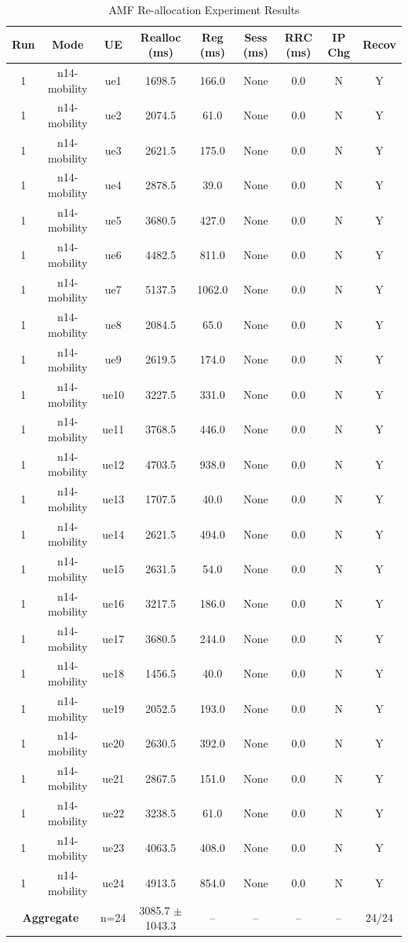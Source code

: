 \begin{table}[ht]
\centering
\begin{tabular}{|c|c|c|c|c|c|c|c|c|}
\hline
Run & Mode & UE & Realloc (ms) & Reg (ms) & Sess (ms) & RRC (ms) & IP Chg & Recov \\
\hline
1 & n14-mobility & ue1 & 1698.5 & 166.0 & None & 0.0 & N & Y \\
1 & n14-mobility & ue2 & 2074.5 & 61.0 & None & 0.0 & N & Y \\
1 & n14-mobility & ue3 & 2621.5 & 175.0 & None & 0.0 & N & Y \\
1 & n14-mobility & ue4 & 2878.5 & 39.0 & None & 0.0 & N & Y \\
1 & n14-mobility & ue5 & 3680.5 & 427.0 & None & 0.0 & N & Y \\
1 & n14-mobility & ue6 & 4482.5 & 811.0 & None & 0.0 & N & Y \\
1 & n14-mobility & ue7 & 5137.5 & 1062.0 & None & 0.0 & N & Y \\
1 & n14-mobility & ue8 & 2084.5 & 65.0 & None & 0.0 & N & Y \\
1 & n14-mobility & ue9 & 2619.5 & 174.0 & None & 0.0 & N & Y \\
1 & n14-mobility & ue10 & 3227.5 & 331.0 & None & 0.0 & N & Y \\
1 & n14-mobility & ue11 & 3768.5 & 446.0 & None & 0.0 & N & Y \\
1 & n14-mobility & ue12 & 4703.5 & 938.0 & None & 0.0 & N & Y \\
1 & n14-mobility & ue13 & 1707.5 & 40.0 & None & 0.0 & N & Y \\
1 & n14-mobility & ue14 & 2621.5 & 494.0 & None & 0.0 & N & Y \\
1 & n14-mobility & ue15 & 2631.5 & 54.0 & None & 0.0 & N & Y \\
1 & n14-mobility & ue16 & 3217.5 & 186.0 & None & 0.0 & N & Y \\
1 & n14-mobility & ue17 & 3680.5 & 244.0 & None & 0.0 & N & Y \\
1 & n14-mobility & ue18 & 1456.5 & 40.0 & None & 0.0 & N & Y \\
1 & n14-mobility & ue19 & 2052.5 & 193.0 & None & 0.0 & N & Y \\
1 & n14-mobility & ue20 & 2630.5 & 392.0 & None & 0.0 & N & Y \\
1 & n14-mobility & ue21 & 2867.5 & 151.0 & None & 0.0 & N & Y \\
1 & n14-mobility & ue22 & 3238.5 & 61.0 & None & 0.0 & N & Y \\
1 & n14-mobility & ue23 & 4063.5 & 408.0 & None & 0.0 & N & Y \\
1 & n14-mobility & ue24 & 4913.5 & 854.0 & None & 0.0 & N & Y \\
\multicolumn{2}{|c|}{\textbf{Aggregate}} & n=24 & 3085.7 $\pm$ 1043.3 & -- & -- & -- & -- & 24/24 \\
\hline
\end{tabular}
\caption{AMF Re-allocation Experiment Results}
\label{tab:amf_realloc}
\end{table}
